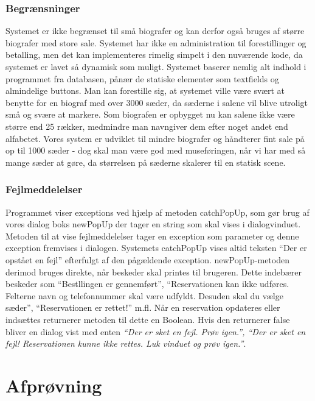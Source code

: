 \documentclass[final]{report}
\begin{document}
\subsection{Begrænsninger}
Systemet er ikke begrænset til små biografer og kan derfor også bruges af større biografer med store sale. Systemet har ikke en administration til forestillinger og betalling, men det kan implementeres rimelig simpelt i den nuværende kode, da systemet er lavet så dynamisk som muligt. Systemet baserer nemlig alt indhold i programmet fra databasen, pånær de statiske elementer som textfields og almindelige buttons. Man kan forestille sig, at systemet ville være svært at benytte for en biograf med over 3000 sæder, da sæderne i salene vil blive utroligt små og svære at markere. Som biografen er opbygget nu kan salene ikke være større end 25 rækker, medmindre man navngiver dem efter noget andet end alfabetet. Vores system er udviklet til mindre biografer og håndterer fint sale på op til 1000 sæder - dog skal man være god med museføringen, når vi har med så mange sæder at gøre, da størrelsen på sæderne skalerer til en statisk scene.

\subsection{Fejlmeddelelser}
Programmet viser exceptions ved hjælp af metoden catchPopUp, som gør brug af vores dialog boks newPopUp der tager en string som skal vises i dialogvinduet. Metoden til at vise fejlmeddelelser tager en exception som parameter og denne exception fremvises i dialogen. Systemets catchPopUp vises altid teksten “Der er opstået en fejl” efterfulgt af den pågældende exception. newPopUp-metoden derimod bruges direkte, når beskeder skal printes til brugeren. Dette indebærer beskeder som “Bestllingen er gennemført”, “Reservationen kan ikke udføres. Felterne navn og telefonnummer skal være udfyldt. Desuden skal du vælge sæder”, “Reservationen er rettet!” m.fl. Når en reservation opdateres eller indsættes returnerer metoden til dette en Boolean. Hvis den returnerer false bliver en dialog vist med enten \emph{“Der er sket en fejl. Prøv igen.”, “Der er sket en fejl! Reservationen kunne ikke rettes. Luk vinduet og prøv igen.”}. 

\chapter{Afprøvning}
\end{document}
